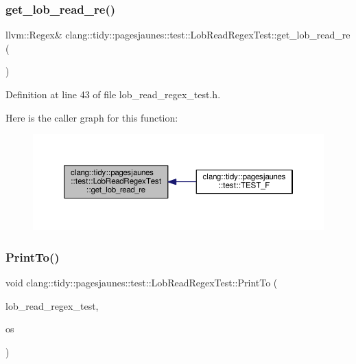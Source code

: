 \subsubsection{\texorpdfstring{get\+\_\+lob\+\_\+read\+\_\+re()}{get\_lob\_read\_re()}}
{\footnotesize\ttfamily llvm\+::\+Regex\& clang\+::tidy\+::pagesjaunes\+::test\+::\+Lob\+Read\+Regex\+Test\+::get\+\_\+lob\+\_\+read\+\_\+re (\begin{DoxyParamCaption}{ }\end{DoxyParamCaption})\hspace{0.3cm}{\ttfamily [inline]}}



Definition at line 43 of file lob\+\_\+read\+\_\+regex\+\_\+test.\+h.

Here is the caller graph for this function\+:
\nopagebreak
\begin{figure}[H]
\begin{center}
\leavevmode
\includegraphics[width=350pt]{classclang_1_1tidy_1_1pagesjaunes_1_1test_1_1_lob_read_regex_test_a8f1510eca033bfef9c6aee621eaba98b_icgraph}
\end{center}
\end{figure}
\mbox{\label{classclang_1_1tidy_1_1pagesjaunes_1_1test_1_1_lob_read_regex_test_a75b7052dcbdb35215fa2e1361bbf4c88}} 
\subsubsection{\texorpdfstring{Print\+To()}{PrintTo()}}
{\footnotesize\ttfamily void clang\+::tidy\+::pagesjaunes\+::test\+::\+Lob\+Read\+Regex\+Test\+::\+Print\+To (\begin{DoxyParamCaption}\item[{const \hyperlink{classclang_1_1tidy_1_1pagesjaunes_1_1test_1_1_lob_read_regex_test}{Lob\+Read\+Regex\+Test} \&}]{lob\+\_\+read\+\_\+regex\+\_\+test,  }\item[{\+::std\+::ostream $\ast$}]{os }\end{DoxyParamCaption})}



